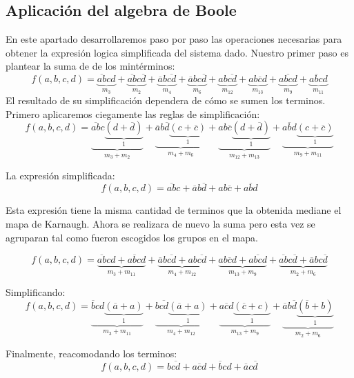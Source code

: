 \subsection{Aplicaci\'on del algebra de Boole}
\indent En este apartado desarrollaremos paso por paso las operaciones necesarias para obtener la expresión logica simplificada del sistema dado.
\indent 
Nuestro primer paso es plantear la suma de de los mintérminos:
\[f(a,b,c,d)= \underbrace{\overline{ab}cd}_{m_3}+
			  \underbrace{\overline{ab}c\overline{d}}_{m_2}
			 +\underbrace{\overline{a}b\overline{cd}}_{m_4}
			 +\underbrace{\overline{a}bc\overline{d}}_{m_6}
			 +\underbrace{ab\overline{cd}}_{m_{12}}
			 +\underbrace{ab\overline{c}d}_{m_{13}}
			 +\underbrace{a\overline{bc}d}_{m_9} 
			 +\underbrace{a\overline{b}cd}_{m_{11}}
			 \]
El resultado de su simplificación dependera de cómo se sumen los terminos. 
Primero aplicaremos ciegamente las reglas de simplificación:
\[ 
	f(a,b,c,d)= \underbrace{\overline{ab}c\underbrace{\left(d+ \overline{d}\right)}_{1}}_{m_3 +m_2}
	+
	\underbrace{\overline{a}b\overline{d}\underbrace{\left(c+ \overline{c}\right)}_{1}}_{m_4 +m_6}
	+
	\underbrace{ab\overline{c}\underbrace{\left(d+ \overline{d}\right)}_{1}}_{m_{12} +m_{13}}
	+
	\underbrace{a\overline{b}d\underbrace{\left(c+ \overline{c}\right)}_{1}}_{m_9 +m_{11}}
\]

La expresión simplificada:
\[ 
	f(a,b,c,d)= 
	\overline{ab}c
	+
	\overline{a}b\overline{d}
	+
	ab\overline{c}
	+
	a\overline{b}d
\]


Esta expresión tiene la misma cantidad de terminos que la obtenida mediane el mapa de Karnaugh. 
Ahora se realizara de nuevo la suma pero esta vez se agruparan tal como fueron escogidos los grupos en el mapa.

$$
f(a,b,c,d)= 
\underbrace{\overline{ab}cd + a\overline{b}cd}_{m_3 + m_{11}}
+
\underbrace{\overline{a}b\overline{cd} + ab\overline{cd}}_{m_4+m_{12}}
+
\underbrace{ab\overline{c}d + a\overline{bc}d }_{m_{13} + m_{9}}
+
\underbrace{\overline{ab}c\overline{d} + \overline{a}bc\overline{d}}_{m_2 + m_6}
$$

Simplificando:
$$f(a,b,c,d)= 
\underbrace{\overline{b}cd\underbrace{\left(\overline{a}+a\right)}_{1}}_{m_3 + m_{11}}
+\underbrace{b\overline{cd}\underbrace{\left(\overline{a}+a\right)}_{1}}_{m_4+m_{12}}
+
\underbrace{a\overline{c}d\underbrace{\left(\overline{c}+c\right)}_{1} }_{m_{13} + m_{9}}
+
\underbrace{\overline{a}b\overline{d}\underbrace{\left(\overline{b}+b\right)}_{1}}_{m_2 + m_6}$$


Finalmente, reacomodando los terminos:
\[
	f(a,b,c,d)= b\overline{cd} + a\overline{c}d +
				\overline{b}cd +\overline{a}c\overline{d}
\]

